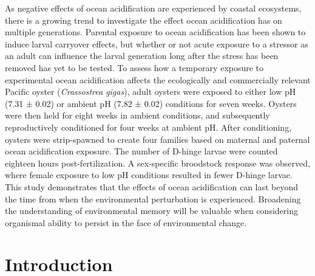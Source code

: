 \documentclass [11pt, proquest] {uwthesis}[2015/03/03]
\begin{document}
As negative effects of ocean acidification are experienced by coastal ecosystems, there is a growing trend to investigate the effect ocean acidification has on multiple generations. Parental exposure to ocean acidification has been shown to induce larval carryover effects, but whether or not acute exposure to a stressor as an adult can influence the larval generation long after the stress has been removed has yet to be tested. To assess how a temporary exposure to experimental ocean acidification affects the ecologically and commercially relevant Pacific oyster (\emph{Crassostrea gigas}), adult oysters were exposed to either low pH (7.31 ± 0.02) or ambient pH (7.82 ± 0.02) conditions for seven weeks. Oysters were then held for eight weeks in ambient conditions, and subsequently reproductively conditioned for four weeks at ambient pH. After conditioning, oysters were strip-spawned to create four families based on maternal and paternal ocean acidification exposure. The number of D-hinge larvae were counted eighteen hours post-fertilization. A sex-specific broodstock response was observed, where female exposure to low pH conditions resulted in fewer D-hinge larvae. This study demonstrates that the effects of ocean acidification can last beyond the time from when the environmental perturbation is experienced. Broadening the understanding of environmental memory will be valuable when considering organismal ability to persist in the face of environmental change.

\hypertarget{introduction-2}{%
\section{Introduction}\label{introduction-2}}
\end{document}
